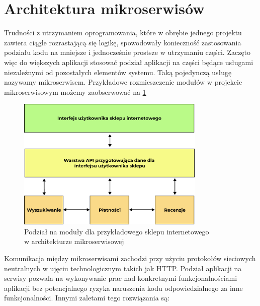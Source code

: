 \documentclass{SGGW-thesis}
\begin{document}
  \section{Architektura mikroserwisów}

  Trudności z utrzymaniem oprogramowania, które w obrębie jednego projektu zawiera ciągle rozrastającą się logikę, spowodowały konieczność zastosowania podziału kodu na mniejsze i jednocześnie prostsze w utrzymaniu części. 
  Zaczęto więc do większych aplikacji stosować podział aplikacji na części będące usługami niezależnymi od pozostałych elementów systemu. Taką pojedynczą usługę nazywamy mikroserwisem. Przykładowe rozmieszczenie modułów w projekcie mikroserwisowym możemy zaobserwować na \cref{fig:microservices_diagram}

  \vfill
  \clearpage

  \begin{figure}[h]
    \centering
    \captionsetup{justification=centering}
    \includegraphics[width=0.8\textwidth]{microservices_diagram.png}
    \caption{Podział na moduły dla przykładowego sklepu internetowego \\ w architekturze mikroserwisowej}
    \label{fig:microservices_diagram}
  \end{figure}


  Komunikacja między mikroserwisami zachodzi przy użyciu protokołów sieciowych neutralnych w ujęciu technologicznym takich jak HTTP. Podział aplikacji na serwisy pozwala na wykonywanie prac nad konkretnymi funkcjonalnościami aplikacji bez potencjalnego ryzyka naruszenia kodu odpowiedzialnego za inne funkcjonalności. Innymi zaletami tego rozwiązania są:
\end{document}
